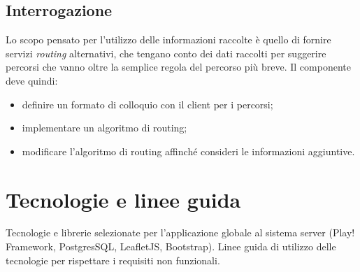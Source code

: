 \subsection{Interrogazione}
Lo scopo pensato per l'utilizzo delle informazioni raccolte è quello di fornire servizi \emph{routing} alternativi, che tengano conto dei dati raccolti per suggerire percorsi che vanno oltre la semplice regola del percorso più breve. Il componente deve quindi:
\begin{itemize}
\item definire un formato di colloquio con il client per i percorsi;
\item implementare un algoritmo di routing;
\item modificare l'algoritmo di routing affinché consideri le informazioni aggiuntive.
\end{itemize}

\section{Tecnologie e linee guida}
Tecnologie e librerie selezionate per l'applicazione globale al sistema server (Play! Framework, PostgresSQL, LeafletJS, Bootstrap). Linee guida di utilizzo delle tecnologie per rispettare i requisiti non funzionali.